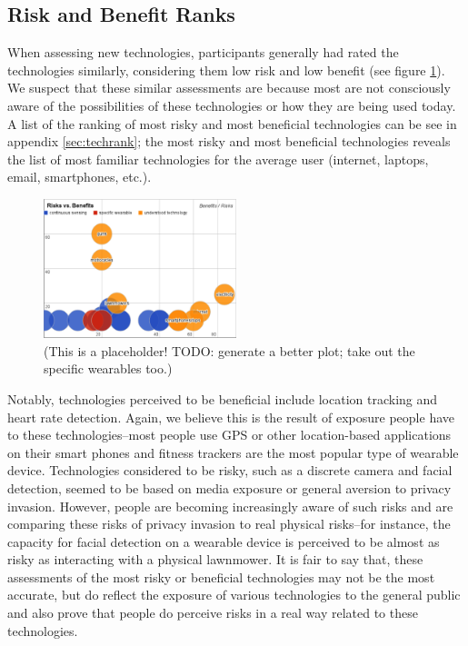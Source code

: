 \documentclass{acm_proc_article-sp}
\begin{document}
\subsection{Risk and Benefit Ranks} 
When assessing new technologies, participants generally had rated the technologies similarly, considering them low risk and low benefit (see figure \ref{fig:techplot}). We suspect that these similar assessments are because most are not consciously aware of the possibilities of these technologies or how they are being used today. A list of the ranking of most risky and most beneficial technologies can be see in appendix \ref{sec:techrank}; the most risky and most beneficial technologies reveals the list of most familiar technologies for the average user (internet, laptops, email, smartphones, etc.). 


\begin{figure}
	\centering
	\includegraphics[width=0.5\textwidth]{techplot.png}
	\caption{(This is a placeholder! TODO: generate a better plot; take out the specific wearables too.)}
	\label{fig:techplot}
\end{figure}

Notably, technologies perceived to be beneficial include location tracking and heart rate detection. Again, we believe this is the result of exposure people have to these technologies--most people use GPS or other location-based applications on their smart phones and fitness trackers are the most popular type of wearable device. Technologies considered to be risky, such as a discrete camera and facial detection, seemed to be based on media exposure or general aversion to privacy invasion. However, people are becoming increasingly aware of such risks and are comparing these risks of privacy invasion to real physical risks--for instance, the capacity for facial detection on a wearable device is perceived to be almost as risky as interacting with a physical lawnmower. It is fair to say that, these assessments of the most risky or beneficial technologies may not be the most accurate, but do reflect the exposure of various technologies to the general public and also prove that people do perceive risks in a real way related to these technologies. 
\end{document}
